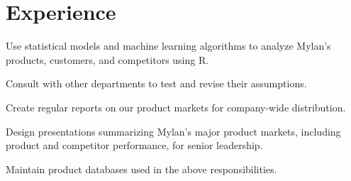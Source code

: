 \documentclass[letterpaper]{deedy-resume} %
\begin{document}
\hfill
%
%
\begin{minipage}[t]{0.63\textwidth} %


\section{Experience}
\vspace{\topsep} %
\begin{tightitemize}
\item Use statistical models and machine learning algorithms to
  analyze Mylan's products, customers, and competitors using R.
\item Consult with other departments to test and revise their assumptions.
\item Create regular reports on our product markets for company-wide
  distribution.
\item Design presentations summarizing Mylan's major product markets,
  including product and competitor performance, for senior leadership.
\item Maintain product databases used in the above responsibilities.
\end{tightitemize}
\sectionspace %


\end{minipage}
\end{document}

